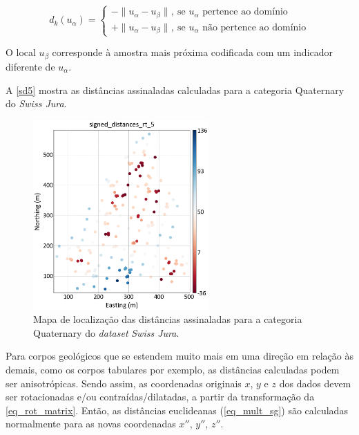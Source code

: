 \begin{equation}
	d_{k}(u_{\alpha})=\begin{cases}
	-\parallel u_\alpha-u_\beta\parallel,\:\textrm{se $u_\alpha$ pertence ao domínio}\\
	+\parallel u_\alpha-u_\beta\parallel,\:\textrm{se $u_\alpha$ não pertence ao domínio}\end{cases}
    \label{eq_mult_sg}
\end{equation}

O local $u_\beta$ corresponde à amostra mais próxima codificada com um indicador diferente de $u_\alpha$.

A \autoref{sd5} mostra as distâncias assinaladas calculadas para a categoria Quaternary do \textit{Swiss Jura}.

\begin{figure}[H]
	\centering
	\caption{\label{sd5}Mapa de localização das distâncias assinaladas para a categoria Quaternary do \textit{dataset} \textit{Swiss Jura}.}
	\includegraphics[width=0.6\textwidth]{capitulo_2/imagens/sd5.png}
\end{figure}

Para corpos geológicos que se estendem muito mais em uma direção em relação às demais, como os corpos tabulares por exemplo, as distâncias calculadas podem ser anisotrópicas. Sendo assim, as coordenadas originais $x$, $y$ e $z$ dos dados devem ser rotacionadas e/ou contraídas/dilatadas, a partir da transformação da \autoref{eq_rot_matrix}. Então, as distâncias euclideanas (\autoref{eq_mult_sg}) são calculadas normalmente para as novas coordenadas $x''$, $y''$, $z''$.


